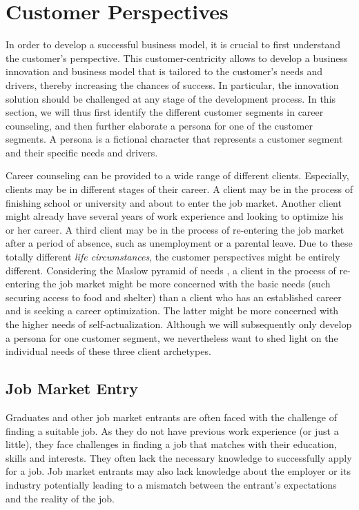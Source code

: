 \section{Customer Perspectives}
\label{sec:customer_perspective}

In order to develop a successful business model, it is crucial to first understand the customer's
perspective. This customer-centricity allows to develop a business innovation and business model
that is tailored to the customer's needs and drivers, thereby increasing the chances of success.
In particular, the innovation solution should be challenged at any stage of the development process.
In this section, we will thus first identify the different customer segments in career counseling,
and then further elaborate a persona for one of the customer segments. A persona is a fictional
character that represents a customer segment and their specific needs and drivers.

Career counseling can be provided to a wide range of different clients. Especially, clients may be
in different stages of their career. A client may be in the process of finishing school or university
and about to enter the job market. Another client might already have several years of work experience
and looking to optimize his or her career. A third client may be in the process of re-entering the job
market after a period of absence, such as unemployment or a parental leave. Due to these totally different
\textit{life circumstances}, the customer perspectives might be entirely different. Considering the
Maslow pyramid of needs \citep{maslowTheoryHumanMotivation1943}, a client in the process of re-entering
the job market might be more concerned with the basic needs (such securing access to food and shelter)
than a client who has an established career and is seeking a career optimization. The latter might be
more concerned with the higher needs of self-actualization. Although we will subsequently only develop
a persona for one customer segment, we nevertheless want to shed light on the individual needs of these
three client archetypes.

\subsection{Job Market Entry}

Graduates and other job market entrants are often faced with the challenge of finding a suitable job. As
they do not have previous work experience (or just a little), they face challenges in finding a job that
matches with their education, skills and interests. They often lack the necessary knowledge to successfully
apply for a job. Job market entrants may also lack knowledge about the employer or its industry potentially
leading to a mismatch between the entrant's expectations and the reality of the job.
\newline

